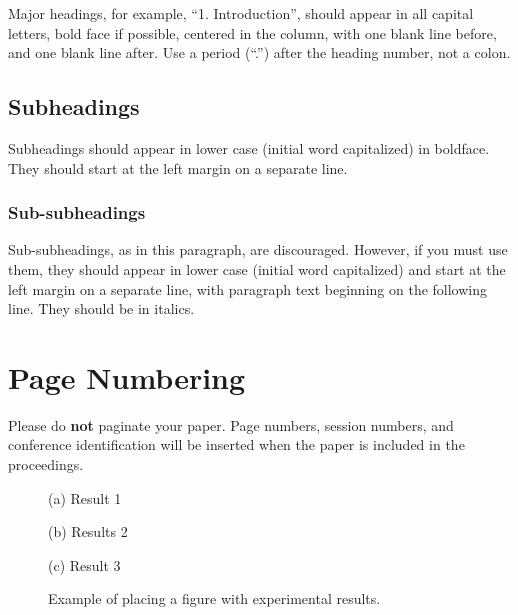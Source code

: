 \documentclass{article}
\begin{document}
Major headings, for example, ``1. Introduction'', should appear in all capital letters, bold face if possible, centered in the column, with one blank line before, and one blank line after. Use a period (``.'') after the heading number, not a colon.

\subsection{Subheadings}

Subheadings should appear in lower case (initial word capitalized) in boldface. They should start at the left margin on a separate line.

\subsubsection{Sub-subheadings}

Sub-subheadings, as in this paragraph, are discouraged. However, if you must use them, they should appear in lower case (initial word capitalized) and start at the left margin on a separate line, with paragraph text beginning on the following line.  They should be in italics.

\section{Page Numbering}

Please do {\bf not} paginate your paper. Page numbers, session numbers, and conference identification will be inserted when the paper is included in the proceedings.

%
\begin{figure}[t]
\begin{minipage}[b]{1.0\linewidth}
  \centering
  \vspace{1.5cm}
  \centerline{(a) Result 1}\medskip
\end{minipage}
%
\begin{minipage}[b]{.48\linewidth}
  \centering
  \vspace{1.5cm}
  \centerline{(b) Results 2}\medskip
\end{minipage}
\hfill
\begin{minipage}[b]{0.48\linewidth}
  \centering
  \vspace{1.5cm}
  \centerline{(c) Result 3}\medskip
\end{minipage}
%
\caption{Example of placing a figure with experimental results.}
\label{fig:res}
\end{figure}
\end{document}
